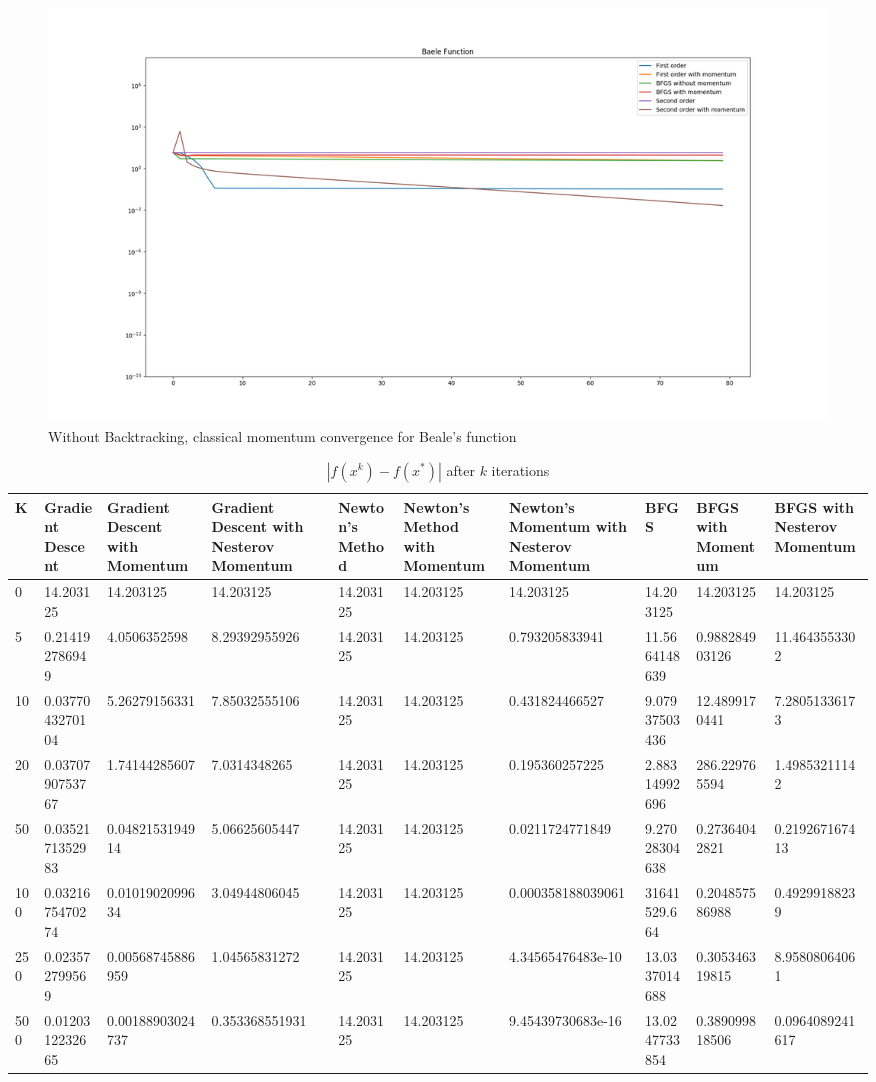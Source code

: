 \documentclass{article}
\begin{document}
\begin{figure}[H]
	\includegraphics[width=\linewidth]{../Images/baelemomentum1.png}
	\caption{Without Backtracking, classical momentum convergence for Beale's function}
	\label{fig:Without Backtracking, classical momentum convergence for Beale's function}
\end{figure}

\begin{table}[H]
	\centering
	\caption{$ | f(x^k) - f(x^*) | $ after $k$ iterations}
	\label{Beale's function table}
	\begin{tabular}{|l|l|l|l|l|l|l|l|l|l|}
		\hline
		K & Gradient Descent & Gradient Descent with Momentum & Gradient Descent with Nesterov Momentum & Newton's Method & Newton's Method with Momentum & Newton's Momentum with Nesterov Momentum & BFGS & BFGS with Momentum & BFGS with Nesterov Momentum \\
		\hline
		0 & 14.203125 & 14.203125 & 14.203125 & 14.203125 & 14.203125 & 14.203125 & 14.203125 & 14.203125 & 14.203125 \\
		\hline
		5 & 0.214192786949 & 4.0506352598 & 8.29392955926 & 14.203125 & 14.203125 & 0.793205833941 & 11.5664148639 & 0.988284903126 & 11.4643553302 \\
		\hline
		10 & 0.0377043270104 & 5.26279156331 & 7.85032555106 & 14.203125 & 14.203125 & 0.431824466527 & 9.07937503436 & 12.4899170441 & 7.28051336173 \\
		\hline
		20 & 0.0370790753767 & 1.74144285607 & 7.0314348265 & 14.203125 & 14.203125 & 0.195360257225 & 2.88314992696 & 286.229765594 & 1.49853211142 \\
		\hline 
		50 & 0.0352171352983 & 0.0482153194914 & 5.06625605447 & 14.203125 & 14.203125 & 0.0211724771849 & 9.27028304638 & 0.27364042821 & 0.219267167413 \\
		\hline 
		100 & 0.0321675470274 & 0.0101902099634 & 3.04944806045 & 14.203125 & 14.203125 & 0.000358188039061 & 31641529.664 & 0.204857586988 & 0.49299188239 \\
		\hline
		250 & 0.023572799569 & 0.00568745886959 & 1.04565831272 & 14.203125 & 14.203125 & 4.34565476483e-10 & 13.0337014688 & 0.305346319815 & 8.95808064061 \\
		\hline
		500 & 0.0120312232665 & 0.00188903024737 & 0.353368551931 & 14.203125 & 14.203125 & 9.45439730683e-16 & 13.0247733854 & 0.389099818506 & 0.0964089241617 \\
		\hline
	\end{tabular}
\end{table}
\end{document}
